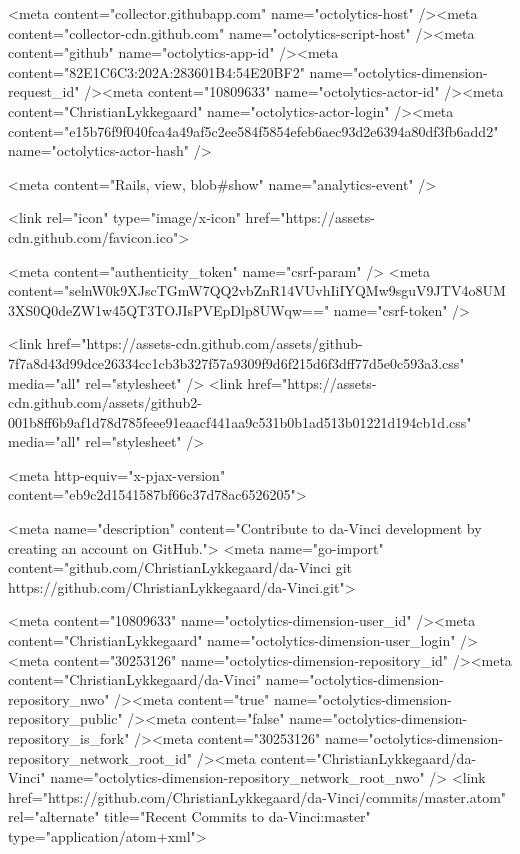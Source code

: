     <meta content="collector.githubapp.com" name="octolytics-host" /><meta content="collector-cdn.github.com" name="octolytics-script-host" /><meta content="github" name="octolytics-app-id" /><meta content="82E1C6C3:202A:283601B4:54E20BF2" name="octolytics-dimension-request_id" /><meta content="10809633" name="octolytics-actor-id" /><meta content="ChristianLykkegaard" name="octolytics-actor-login" /><meta content="e15b76f9f040fca4a49af5c2ee584f5854efeb6aec93d2e6394a80df3fb6add2" name="octolytics-actor-hash" />
    
    <meta content="Rails, view, blob#show" name="analytics-event" />

    
    
    <link rel="icon" type="image/x-icon" href="https://assets-cdn.github.com/favicon.ico">


    <meta content="authenticity_token" name="csrf-param" />
<meta content="selnW0k9XJscTGmW7QQ2vbZnR14VUvhIiIYQMw9sguV9JTV4o8UM3XS0Q0deZW1w45QT3TOJIsPVEpDlp8UWqw==" name="csrf-token" />

    <link href="https://assets-cdn.github.com/assets/github-7f7a8d43d99dce26334cc1cb3b327f57a9309f9d6f215d6f3dff77d5e0c593a3.css" media="all" rel="stylesheet" />
    <link href="https://assets-cdn.github.com/assets/github2-001b8ff6b9af1d78d785feee91eaacf441aa9c531b0b1ad513b01221d194cb1d.css" media="all" rel="stylesheet" />
    
    


    <meta http-equiv="x-pjax-version" content="eb9c2d1541587bf66c37d78ac6526205">

      
  <meta name="description" content="Contribute to da-Vinci development by creating an account on GitHub.">
  <meta name="go-import" content="github.com/ChristianLykkegaard/da-Vinci git https://github.com/ChristianLykkegaard/da-Vinci.git">

  <meta content="10809633" name="octolytics-dimension-user_id" /><meta content="ChristianLykkegaard" name="octolytics-dimension-user_login" /><meta content="30253126" name="octolytics-dimension-repository_id" /><meta content="ChristianLykkegaard/da-Vinci" name="octolytics-dimension-repository_nwo" /><meta content="true" name="octolytics-dimension-repository_public" /><meta content="false" name="octolytics-dimension-repository_is_fork" /><meta content="30253126" name="octolytics-dimension-repository_network_root_id" /><meta content="ChristianLykkegaard/da-Vinci" name="octolytics-dimension-repository_network_root_nwo" />
  <link href="https://github.com/ChristianLykkegaard/da-Vinci/commits/master.atom" rel="alternate" title="Recent Commits to da-Vinci:master" type="application/atom+xml">

